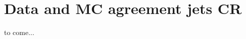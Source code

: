 \documentclass[14pt, a4paper]{book}
\begin{document}
\chapter{Data and MC agreement jets CR}\label{appendix:no_padding}
to come...


\clearpage
\end{document}
